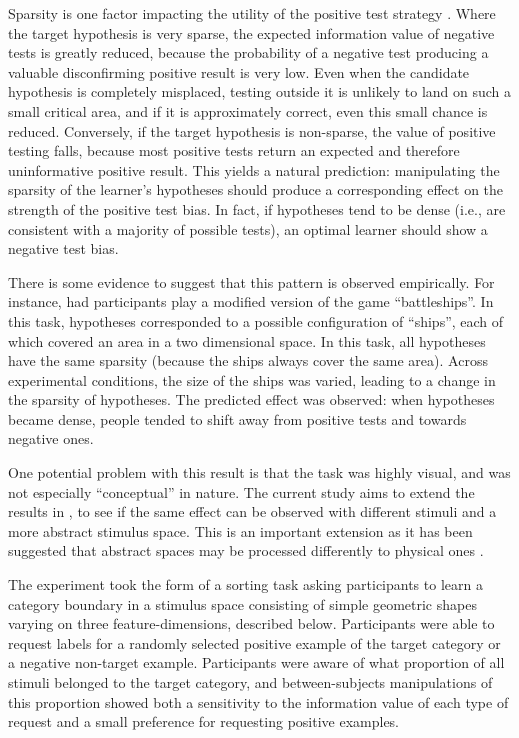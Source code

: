 \documentclass[10pt,letterpaper]{article}
\begin{document}
Sparsity is one factor impacting the utility of the positive test strategy \cite{klayman1987confirmation, navarro2011sparsecat}. Where the target hypothesis is very sparse, the expected information value of negative tests is greatly reduced, because the probability of a negative test producing a valuable disconfirming positive result is very low. %
Even when the candidate hypothesis is completely misplaced, testing outside it is unlikely to land on such a small critical area, and if it is approximately correct, even this small chance is reduced. Conversely, if the target hypothesis is non-sparse, the value of positive testing falls, because most positive tests return an expected and therefore uninformative positive result. This yields a natural prediction: manipulating the sparsity of the learner's hypotheses should produce a corresponding effect on the strength of the positive test bias. In fact, if hypotheses tend to be dense (i.e., are consistent with a majority of possible tests), an optimal learner should show a negative test bias. 

There is some evidence to suggest that this pattern is observed empirically. For instance,   had participants play a modified version of the game ``battleships''. In this task, hypotheses corresponded to a possible configuration of ``ships'', each of which covered an area in a two dimensional space. In this task, all hypotheses have the same sparsity (because the ships always cover the same area). Across experimental conditions, the size of the ships was varied, leading to a change in the sparsity of hypotheses. The predicted effect was observed: when hypotheses became dense, people tended to shift away from positive tests and towards negative ones. 

One potential problem with this result is that the task was highly visual, and was not especially ``conceptual'' in nature. The current study aims to extend the results in , to see if the same effect can be observed with different stimuli and a more abstract stimulus space. This is an important extension as it has been suggested that abstract spaces may be processed differently to physical ones \cite{cherubini2010questionasymmetry}.

The experiment took the form of a sorting task asking participants to learn a category boundary in a stimulus space consisting of simple geometric shapes varying on three feature-dimensions, described below. Participants were able to request labels for a randomly selected positive example of the target category or a negative non-target example. Participants were aware of what proportion of all stimuli belonged to the target category, and between-subjects manipulations of this proportion showed both a sensitivity to the information value of each type of request and a small preference for requesting positive examples.
\end{document}
